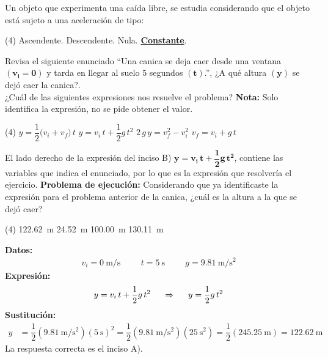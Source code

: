 \documentclass[12pt, letter]{exam}
\begin{document}
\begin{questions}
    \question Un objeto que experimenta una caída libre, se estudia considerando que el objeto está sujeto a una aceleración de tipo:
    \begin{tasks}(4)
        \task Ascendente.
        \task Descendente.
        \task Nula.
        \task \underline{\textbf{Constante}}.
    \end{tasks}
    \question Revisa el siguiente enunciado \enquote{Una canica se deja caer desde una ventana $\mathbf{(v_{i} = 0)}$ y tarda en llegar al suelo \num{5} segundos $\mathbf{(t)}$.}, ¿A qué altura $\mathbf{(y)}$ se dejó caer la canica?. 
    \\
    ¿Cuál de las siguientes expresiones nos resuelve el problema? \textbf{Nota: } Solo identifica la expresión, no se pide obtener el valor.
    \begin{tasks}(4)
        \task $y = \dfrac{1}{2} \big( v_{i} + v_{f} \big) \, t$
        \task $y = v_{i} \, t + \dfrac{1}{2} g \, t^{2}$
        \task $2 \, g \, y = v_{f}^{2} - v_{i}^{2}$
        \task $v_{f} = v_{i} + g \, t$
    \end{tasks}
    El lado derecho de la expresión del inciso B) $\mathbf{y = v_{i} \, t + \dfrac{1}{2} g \, t^{2}}$, contiene las variables que indica el enunciado, por lo que es la expresión que resolvería el ejercicio. 
    \question \label{Problema_02} \textbf{Problema de ejecución:} Considerando que ya identificaste la expresión para el problema anterior de la canica, ¿cuál es la altura a la que se dejó caer?
    \begin{tasks}(4)
        \task \SI{122.62}{\meter}
        \task \SI{24.52}{\meter}
        \task \SI{100.00}{\meter}
        \task \SI{130.11}{\meter}
    \end{tasks}
    \textbf{Datos:}
    \begin{align*}
    v_{i} = \SI{0}{\meter\per\second} \hspace{1cm} t = \SI{5}{\second} \hspace{1cm} g = \SI{9.81}{\meter\per\square\second}
    \end{align*}
    \textbf{Expresión:}
    \begin{align*}
    y = v_{i} \, t + \dfrac{1}{2} g \, t^{2} \hspace{0.5cm} \Rightarrow \hspace{0.5cm} y = \dfrac{1}{2} g \, t^{2}
    \end{align*}
    \textbf{Sustitución:}
    \begin{align*}
    y &= \dfrac{1}{2} \left( \SI{9.81}{\meter\per\square\second} \right) \left( \SI{5}{\second} \right)^{2} =  \dfrac{1}{2} \left( \SI{9.81}{\meter\per\square\second} \right) \left( \SI{25}{\square\second} \right) = \dfrac{1}{2} \left( \SI{245.25}{\meter} \right) = \SI{122.62}{\meter}
    \end{align*}
    La respuesta correcta es el inciso A).


\end{questions}
\end{document}
